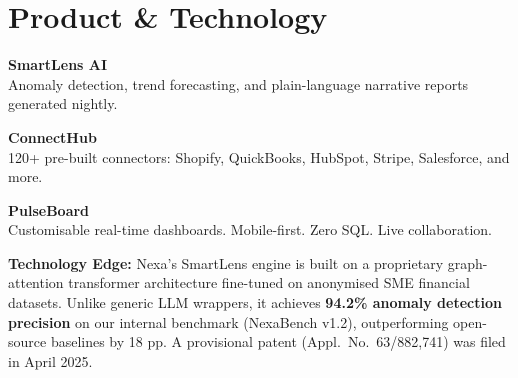 \section{\sectionicon{\faCube}Product \& Technology}

\noindent
\begin{minipage}[t]{0.30\linewidth}
  \begin{tcolorbox}[statbox=NexaTeal]
    {\color{white}\bfseries\large SmartLens AI}\\[4pt]
    {\color{white!80!NexaTeal}\small Anomaly detection, trend forecasting, and plain-language narrative reports generated nightly.}
  \end{tcolorbox}
\end{minipage}\hspace{4pt}
\begin{minipage}[t]{0.30\linewidth}
  \begin{tcolorbox}[statbox=NexaNavy]
    {\color{white}\bfseries\large ConnectHub}\\[4pt]
    {\color{white!80!NexaNavy}\small 120+ pre-built connectors: Shopify, QuickBooks, HubSpot, Stripe, Salesforce, and more.}
  \end{tcolorbox}
\end{minipage}\hspace{4pt}
\begin{minipage}[t]{0.30\linewidth}
  \begin{tcolorbox}[statbox=NexaGold]
    {\color{white}\bfseries\large PulseBoard}\\[4pt]
    {\color{white!80!NexaGold}\small Customisable real-time dashboards. Mobile-first. Zero SQL. Live collaboration.}
  \end{tcolorbox}
\end{minipage}

\par\vspace{6pt}

\begin{tcolorbox}[warnbox]
  \textbf{\textcolor{NexaGold}{\faStar}\enspace Technology Edge:} Nexa's SmartLens engine is built on a proprietary
  graph-attention transformer architecture fine-tuned on anonymised SME financial datasets.
  Unlike generic LLM wrappers, it achieves \textbf{94.2\% anomaly detection precision} on
  our internal benchmark (NexaBench v1.2), outperforming open-source baselines by 18 pp.
  A provisional patent (Appl.\ No.\ 63/882,741) was filed in April 2025.
\end{tcolorbox}

